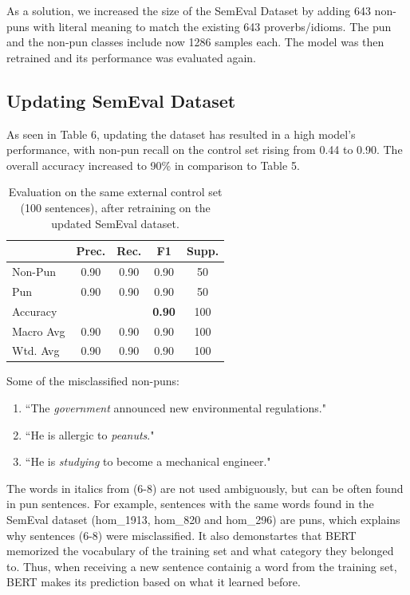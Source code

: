 \documentclass[11pt,a4paper]{article}
\begin{document}
As a solution, we increased the size of the SemEval Dataset by adding 643 non-puns with literal meaning to match the existing 643 proverbs/idioms. The pun and the non-pun classes include now 1286 samples each. The model was then retrained and its performance was evaluated again.


\subsection{Updating SemEval Dataset}
As seen in Table 6, updating the dataset has resulted in a high model's performance, with non-pun recall on the control set rising from 0.44 to 0.90. The overall accuracy increased to 90\% in comparison to Table 5.

\begin{table}[h]
\centering
\small %
\setlength{\tabcolsep}{4pt} %
\begin{tabular}{l|cccc}
\hline
& \textbf{Prec.} & \textbf{Rec.} & \textbf{F1} & \textbf{Supp.} \\ 
\hline
Non-Pun      & 0.90 & 0.90 & 0.90 & 50  \\
Pun          & 0.90 & 0.90 & 0.90 & 50  \\
\hline
Accuracy     &      &      & \textbf{0.90} & 100 \\
Macro Avg    & 0.90 & 0.90 & 0.90 & 100 \\
Wtd. Avg     & 0.90 & 0.90 & 0.90 & 100 \\
\hline
\end{tabular}
\caption{Evaluation on the same external control set (100 sentences), after retraining on the updated SemEval dataset.}
\label{tab:updated_control_test}
\end{table}

Some of the misclassified non-puns:

\begin{enumerate}
    \item[(6)] ``The \textit{government} announced new environmental regulations."
    \item[(7)] ``He is allergic to \textit{peanuts}."
    \item[(8)] ``He is \textit{studying} to become a mechanical engineer."
\end{enumerate}

The words in italics from (6-8) are not used ambiguously, but can be often found in pun sentences. For example, sentences with the same words found in the SemEval dataset (hom\_1913, hom\_820 and hom\_296) are puns, which explains why sentences (6-8) were misclassified. It also demonstartes that BERT memorized the vocabulary of the training set and what category they belonged to. Thus, when receiving a new sentence containig a word from the training set, BERT makes its prediction based on what it learned before.
\end{document}
